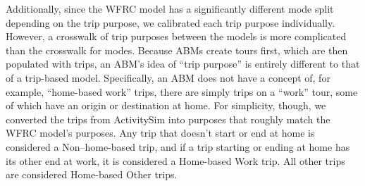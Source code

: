 \documentclass[fancy, twoside, mastersfancy, ms]{byuthesis}
\begin{document}
\begin{table}

\caption{\label{tbl-mode-crosswalk}Crosswalk Between Modes in Both
Models}


\end{table}%

Additionally, since the WFRC model has a significantly different mode
split depending on the trip purpose, we calibrated each trip purpose
individually. However, a crosswalk of trip purposes between the models
is more complicated than the crosswalk for modes. Because ABMs create
tours first, which are then populated with trips, an ABM's idea of
``trip purpose'' is entirely different to that of a trip-based model.
Specifically, an ABM does not have a concept of, for example,
``home-based work'' trips, there are simply trips on a ``work'' tour,
some of which have an origin or destination at home. For simplicity,
though, we converted the trips from ActivitySim into purposes that
roughly match the WFRC model's purposes. Any trip that doesn't start or
end at home is considered a Non--home-based trip, and if a trip starting
or ending at home has its other end at work, it is considered a
Home-based Work trip. All other trips are considered Home-based Other
trips.
\end{document}
